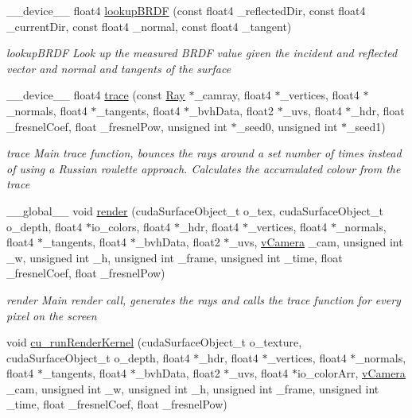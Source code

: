\begin{DoxyCompactItemize}
\item 
\-\_\-\-\_\-device\-\_\-\-\_\- float4 \hyperlink{PathTracer_8cu_a4ba7d65d0b55f6b729da6a78b862f600}{lookup\-B\-R\-D\-F} (const float4 \-\_\-reflected\-Dir, const float4 \-\_\-current\-Dir, const float4 \-\_\-normal, const float4 \-\_\-tangent)
\begin{DoxyCompactList}\small\item\em lookup\-B\-R\-D\-F Look up the measured B\-R\-D\-F value given the incident and reflected vector and normal and tangents of the surface \end{DoxyCompactList}\item 
\-\_\-\-\_\-device\-\_\-\-\_\- float4 \hyperlink{PathTracer_8cu_a46cfba192ea0adba7cd6cdd42bc39762}{trace} (const \hyperlink{structRay}{Ray} $\ast$\-\_\-camray, float4 $\ast$\-\_\-vertices, float4 $\ast$\-\_\-normals, float4 $\ast$\-\_\-tangents, float4 $\ast$\-\_\-bvh\-Data, float2 $\ast$\-\_\-uvs, float4 $\ast$\-\_\-hdr, float \-\_\-fresnel\-Coef, float \-\_\-fresnel\-Pow, unsigned int $\ast$\-\_\-seed0, unsigned int $\ast$\-\_\-seed1)
\begin{DoxyCompactList}\small\item\em trace Main trace function, bounces the rays around a set number of times instead of using a Russian roulette approach. Calculates the accumulated colour from the trace \end{DoxyCompactList}\item 
\-\_\-\-\_\-global\-\_\-\-\_\- void \hyperlink{PathTracer_8cu_adbe4eadbb88568d75c4ddc11b6c41d31}{render} (cuda\-Surface\-Object\-\_\-t o\-\_\-tex, cuda\-Surface\-Object\-\_\-t o\-\_\-depth, float4 $\ast$io\-\_\-colors, float4 $\ast$\-\_\-hdr, float4 $\ast$\-\_\-vertices, float4 $\ast$\-\_\-normals, float4 $\ast$\-\_\-tangents, float4 $\ast$\-\_\-bvh\-Data, float2 $\ast$\-\_\-uvs, \hyperlink{structvCamera}{v\-Camera} \-\_\-cam, unsigned int \-\_\-w, unsigned int \-\_\-h, unsigned int \-\_\-frame, unsigned int \-\_\-time, float \-\_\-fresnel\-Coef, float \-\_\-fresnel\-Pow)
\begin{DoxyCompactList}\small\item\em render Main render call, generates the rays and calls the trace function for every pixel on the screen \end{DoxyCompactList}\item 
void \hyperlink{PathTracer_8cu_ac928700f7e1284e9c48b3e9972057216}{cu\-\_\-run\-Render\-Kernel} (cuda\-Surface\-Object\-\_\-t o\-\_\-texture, cuda\-Surface\-Object\-\_\-t o\-\_\-depth, float4 $\ast$\-\_\-hdr, float4 $\ast$\-\_\-vertices, float4 $\ast$\-\_\-normals, float4 $\ast$\-\_\-tangents, float4 $\ast$\-\_\-bvh\-Data, float2 $\ast$\-\_\-uvs, float4 $\ast$io\-\_\-color\-Arr, \hyperlink{structvCamera}{v\-Camera} \-\_\-cam, unsigned int \-\_\-w, unsigned int \-\_\-h, unsigned int \-\_\-frame, unsigned int \-\_\-time, float \-\_\-fresnel\-Coef, float \-\_\-fresnel\-Pow)

\end{DoxyCompactItemize}
